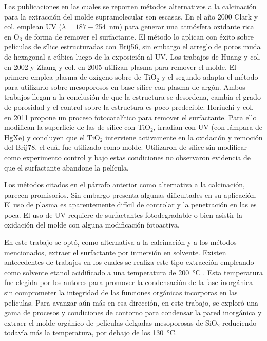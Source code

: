 	Las publicaciones en las cuales se reporten métodos alternativos a la calcinación para la extracción del molde supramolecular son escasas. En el año 2000 Clark y col.\cite{Clark2000} emplean UV ($\lambda=187-$\SI{254}{\nm}) para generar una atmósfera oxidante rica en O$_3$ de forma de remover el surfactante. El método lo aplican con éxito sobre películas de sílice estructuradas con Brij56, sin embargo el arreglo de poros muda de hexagonal a cúbica luego de la exposición al UV. Los trabajos de Huang y col. en 2002\cite{Huang2002} y Zhang y col. en 2005\cite{Zhang2005} utilizan plasma para remover el molde. El primero emplea plasma de oxigeno sobre \pdm\space de TiO$_2$ y el segundo adapta el método para utilizarlo sobre mesoporosos en base sílice con plasma de argón. Ambos trabajos llegan a la conclusión de que la estructura se desordena, cambia el grado de porosidad y el control sobre la estructura es poco predecible. Horiuchi y col.\cite{Horiuchi2011} en 2011 propone un proceso fotocatalítico para remover el surfactante. Para ello modifican la superficie de las \pdm\space de sílice con TiO$_2$, irradian con UV (con lámpara de HgXe) y concluyen que el TiO$_2$ interviene activamente en la oxidación y remoción del Brij78, el cuál fue utilizado como molde. Utilizaron \pdm\space de sílice sin modificar como experimento control y bajo estas condiciones no observaron evidencia de que el surfactante abandone la película.

	Los métodos citados en el párrafo anterior como alternativa a la calcinación, parecen promisorios. Sin embargo presenta algunas dificultades en su aplicación. El uso de plasma es aparentemente difícil de controlar y la penetración en las \pdm\space es poca. El uso de UV requiere de surfactantes fotodegradable o bien asistir la oxidación del molde con alguna modificación fotoactiva.

	En este trabajo se optó, como alternativa a la calcinación y a los métodos mencionados, extraer el surfactante por inmersión en solvente. Existen antecedentes de trabajos en los cuales se realiza este tipo extracción empleando como solvente etanol acidificado a una temperatura de \SI{200}{\celsius} \cite{Angelome2008,Calvo20210,Calvo2010,Fuertes2009}. Esta temperatura fue elegida por los autores para promover la condensación de la fase inorgánica sin comprometer la integridad de las funciones orgánicas incorporas en las películas. Para avanzar aún más en esa dirección, en este trabajo, se exploró una gama de procesos y condiciones de contorno para condensar la pared inorgánica y extraer el molde orgánico de películas delgadas mesoporosas de SiO$_2$ reduciendo todavía más la temperatura, por debajo de los \SI{130}{\celsius}.

